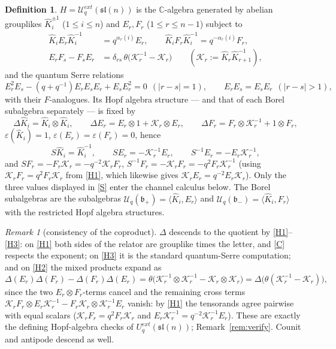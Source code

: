 \documentclass[11pt]{article}
\theoremstyle{definition}
\newtheorem{definition}[theorem]{Definition}
\theoremstyle{remark}
\newtheorem{remark}[theorem]{Remark}
\newcommand{\la}{\langle}
\newcommand{\ra}{\rangle}
\newcommand{\C}{\mathbb{C}}
\newcommand{\Uq}{\mathcal{U}_q}
\newcommand{\bp}{\mathfrak{b}_+}
\newcommand{\bm}{\mathfrak{b}_-}
\newcommand{\del}{\delta}
\newcommand{\hK}{\hat K}
\newcommand{\cK}{\mathcal K}
\newcommand{\vep}{\varepsilon}
\newcommand{\tht}{\theta}
\newcommand{\coloneqq}{\mathrel{:=}}
\begin{document}
\begin{definition}\label{def:H}
$H=\Uq^{ext}(\mathfrak{sl}(n))$ is the $\C$-algebra generated by
abelian grouplikes $\hK_i^{\pm1}$ ($1\le i\le n$) and $E_r,F_r$
($1\le r\le n-1$) subject to
\begin{align}
\hK_iE_r\hK_i^{-1}&=q^{\alpha_r(i)}E_r,\qquad
\hK_iF_r\hK_i^{-1}=q^{-\alpha_r(i)}F_r,\label{H1}\tag{H1}\\
E_rF_s-F_sE_r&=\del_{rs}\,\tht\bigl(\cK_r^{-1}-\cK_r\bigr)
\qquad(\cK_r\coloneqq\hK_r\hK_{r+1}^{-1}),\label{H2}\tag{H2}
\end{align}
and the quantum Serre relations
\begin{equation}
E_r^2E_s-(q+q^{-1})E_rE_sE_r+E_sE_r^2=0\ \ (|r-s|=1),\qquad
E_rE_s=E_sE_r\ \ (|r-s|>1),\label{H3}\tag{H3}
\end{equation}
with their $F$-analogues.  \review{The relation  $\hK_1 \hK_2 \cdots \hK_n=1$ is missing.} Its Hopf algebra structure — and that of
each Borel subalgebra separately — is fixed by
\begin{equation}
\Delta\hK_i=\hK_i\otimes\hK_i,\qquad
\Delta E_r=E_r\otimes1+\cK_r\otimes E_r,\qquad
\Delta F_r=F_r\otimes\cK_r^{-1}+1\otimes F_r,\label{C}\tag{C}
\end{equation}
$\vep(\hK_i)=1$, $\vep(E_r)=\vep(F_r)=0$, hence
\begin{equation}
S\hK_i=\hK_i^{-1},\qquad SE_r=-\cK_r^{-1}E_r,\qquad
S^{-1}E_r=-E_r\cK_r^{-1},\label{S}\tag{S}
\end{equation}
and $SF_r=-F_r\cK_r=-q^{-2}\cK_rF_r$,
$S^{-1}F_r=-\cK_rF_r=-q^{2}F_r\cK_r^{-1}$ (using
$\cK_rF_r=q^{2}F_r\cK_r$ from \eqref{H1}, which likewise gives
$\cK_rE_r=q^{-2}E_r\cK_r$).  Only the three values displayed in
\eqref{S} enter the channel calculus below.
The Borel subalgebras are the subalgebras
$\Uq(\bp)=\la\hK_i,E_r\ra$ and $\Uq(\bm)=\la\hK_i,F_r\ra$ with the
restricted Hopf algebra structures.
\end{definition}

\begin{remark}[consistency of the coproduct]\label{rem:hopfok}
$\Delta$ descends to the quotient by \eqref{H1}--\eqref{H3}: on
\eqref{H1} both sides of the relator are grouplike times the letter,
and \eqref{C} respects the exponent; on \eqref{H3} it is the standard
quantum-Serre computation; and on \eqref{H2} the mixed products
expand as
\[
\Delta(E_r)\Delta(F_r)-\Delta(F_r)\Delta(E_r)
=\tht\bigl(\cK_r^{-1}\otimes\cK_r^{-1}-\cK_r\otimes\cK_r\bigr)
=\Delta\bigl(\tht(\cK_r^{-1}-\cK_r)\bigr),
\]
since the two $E_r\otimes F_r$-terms cancel and the remaining cross
terms $\cK_rF_r\otimes E_r\cK_r^{-1}-F_r\cK_r\otimes\cK_r^{-1}E_r$
vanish: by \eqref{H1} the tensorands agree pairwise with equal
scalars ($\cK_rF_r=q^{2}F_r\cK_r$ and
$E_r\cK_r^{-1}=q^{-2}\cK_r^{-1}E_r$).  These are exactly the defining
Hopf-algebra checks of $U_q^{ext}(\mathfrak{sl}(n))$;
Remark~\ref{rem:verify}.  Counit and antipode descend as well.
\end{remark}
\end{document}
